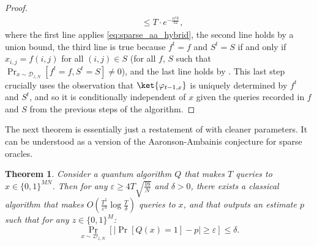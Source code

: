 \documentclass[10pt,a4paper]{article}
\newtheorem{theorem}{Theorem}
\newcommand{\eps}{\varepsilon}
\begin{document}
\begin{proof}
\begin{align*}
&\le T \cdot e^{-\frac{\alpha^4 k}{32}},
\end{align*}
where the first line applies \eqref{eq:sparse_aa_hybrid}, the second line holds by a union bound, the third line is true because $f^t = f$ and $S^t = S$ if and only if $x_{i,j} = f(i,j)$ for all $(i, j) \in S$ (for all $f$, $S$ such that $\Pr_{x \sim \mathcal{D}_{z,N}}\left[f^t = f, S^t = S\right] \neq 0$), and the last line holds by . This last step crucially uses the observation that $\ket{\varphi_{t-1,x}}$ is uniquely determined by $f^t$ and $S^t$, and so it is conditionally independent of $x$ given the queries recorded in $f$ and $S$ from the previous steps of the algorithm.
\end{proof}

The next theorem is essentially just a restatement of  with cleaner parameters. It can be understood as a version of the Aaronson-Ambainis conjecture \cite[Conjecture 1.5]{AA14} for sparse oracles.

\begin{theorem}
\label{thm:sparse_aa_parameterized}
Consider a quantum algorithm $Q$ that makes $T$ queries to $x \in \{0,1\}^{MN}$. Then for any $\eps \ge 4T\sqrt{\frac{16}{N}}$ and $\delta > 0$, there exists a classical algorithm that makes $O\left(\frac{T^5}{\eps^4}\log \frac{T}{\delta}\right)$ queries to $x$, and that outputs an estimate $p$ such that for any $z \in \{0,1\}^M$:
\[
\Pr_{x \sim \mathcal{D}_{z,N}} \left[|\Pr[Q(x) = 1] - p| \ge \eps \right] \le \delta.
\]
\end{theorem}
\end{document}
